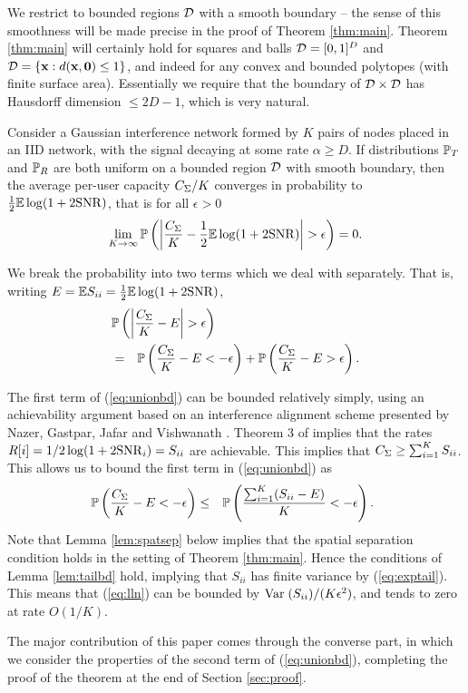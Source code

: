 \documentclass[journal]{IEEEtran}
\begin{document}
We restrict to bounded
regions ${\mathcal{D}}$ with a smooth boundary -- the sense of this smoothness will be made
precise in the proof of Theorem \ref{thm:main}. Theorem \ref{thm:main} will certainly
hold for squares and balls ${\mathcal{D}} = [0,1]^D$ and ${\mathcal{D}} = \{ {\mathbf{ x}}: d({\mathbf{ x}}, {\mathbf{ 0}})
\leq 1 \}$, and indeed for any convex and bounded polytopes (with finite surface area). 
Essentially we require that the boundary of ${\mathcal{D}} \times {\mathcal{D}}$
has Hausdorff dimension $\leq 2D-1$, which is very natural.
%
\begin{theorem} \label{thm:main}
Consider a Gaussian interference network formed by $K$ pairs of 
nodes placed in an IID network, with the signal decaying at some rate $\alpha \geq D$.
If distributions ${\mathbb {P}}_T$ and ${\mathbb {P}}_R$ are both uniform on a bounded region ${\mathcal{D}}$ with
smooth boundary, then
the average per-user capacity $C_{\Sigma}/K$ converges in probability to 
$\frac{1}{2} {\mathbb {E}} \log(1 + 2 {\rm{SNR}})$, that is for all $\epsilon > 0$
$$ \lim_{K \rightarrow \infty} {\mathbb {P}} \left( \left| \frac{C_{\Sigma}}{K} - 
\frac{1}{2} {\mathbb {E}} \log(1 + 2 {\rm{SNR}})
 \right| > \epsilon \right)
= 0.$$
\end{theorem}
\begin{IEEEproof}
We  break the probability into two terms which we deal
with separately. That is, writing
$E = {\mathbb {E}} S_{ii} = \frac{1}{2} {\mathbb {E}} \log(1 + 2 {\rm{SNR}})$,
\begin{eqnarray} 
\lefteqn{ \pr \left( \left| \frac{\csum}{K} - E \right| > \epsilon \right)
} \nonumber \\
& = & \pr \left( \frac{\csum}{K} - E  < -\epsilon \right) +
\pr \left( \frac{\csum}{K} - E  > \epsilon \right).
\label{eq:unionbd}
\end{eqnarray}


The first term of (\ref{eq:unionbd}) 
can be bounded relatively simply, using an achievability
argument based on an interference alignment scheme presented 
by Nazer, Gastpar, Jafar and Vishwanath \cite{nazer}. 
Theorem 3 of \cite{nazer} implies that the rates $R[i] =
1/2 \log(1 + 2 {\rm{SNR}}_i) = S_{ii}$ are achievable. This implies that
$C_{\Sigma} \geq \sum_{i=1}^K S_{ii}$. This allows us to bound the first term in
(\ref{eq:unionbd}) as 
\begin{eqnarray}
{\mathbb {P}} \left( \frac{C_{\Sigma}}{K} - E  < -\epsilon \right)
& \leq &  {\mathbb {P}} \left( \frac{\sum_{i=1}^K (S_{ii}-E)}{K}   < -\epsilon \right).\;\;
\label{eq:lln}
\end{eqnarray}
%
Note that Lemma \ref{lem:spatsep} below implies that the spatial
separation condition holds in the setting of Theorem \ref{thm:main}.
Hence the conditions of Lemma \ref{lem:tailbd} hold, implying that $S_{ii}$ has finite variance
by (\ref{eq:exptail}).
This means that (\ref{eq:lln})
 can be bounded by ${\rm{Var\;}}(S_{ii})/(K \epsilon^2)$, and tends to zero
at rate $O(1/K)$.

The major contribution of this paper comes through the converse part,
in which we consider the properties of the second term of (\ref{eq:unionbd}), 
completing the proof of the theorem at the 
end of Section \ref{sec:proof}. 
\end{IEEEproof}
\end{document}
